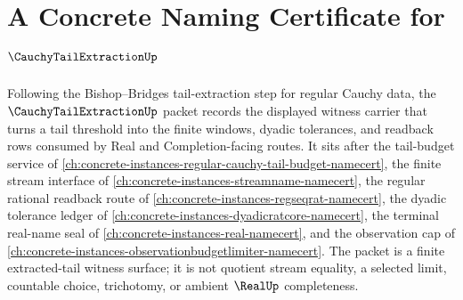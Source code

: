\chapter{A Concrete Naming Certificate for $\CauchyTailExtractionUp$}
\label{ch:concrete-instances-cauchy-tail-extraction-namecert}

Following the Bishop--Bridges tail-extraction step for regular Cauchy data, the $\CauchyTailExtractionUp$ packet records the displayed witness carrier that turns a tail threshold into the finite windows, dyadic tolerances, and readback rows consumed by Real and Completion-facing routes. It sits after the tail-budget service of \autoref{ch:concrete-instances-regular-cauchy-tail-budget-namecert}, the finite stream interface of \autoref{ch:concrete-instances-streamname-namecert}, the regular rational readback route of \autoref{ch:concrete-instances-regseqrat-namecert}, the dyadic tolerance ledger of \autoref{ch:concrete-instances-dyadicratcore-namecert}, the terminal real-name seal of \autoref{ch:concrete-instances-real-namecert}, and the observation cap of \autoref{ch:concrete-instances-observationbudgetlimiter-namecert}. The packet is a finite extracted-tail witness surface; it is not quotient stream equality, a selected limit, countable choice, trichotomy, or ambient $\RealUp$ completeness.

